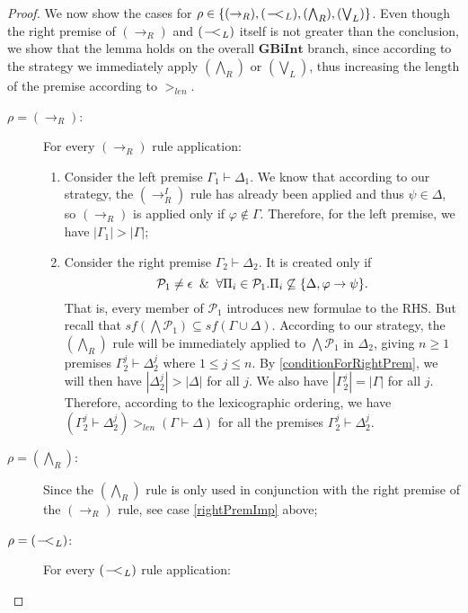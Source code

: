 \documentclass{llncs}
\numberwithin{equation}{section}
\newcommand{\Pred}{{\mathcal{P}}}
\newcommand{\ExImp}{\rightarrow}
\newcommand{\sequent}{\vdash}
\newcommand{\Imp}{\rightarrow}
\newcommand{\WeakImp}{
\begin{picture}(10,10)
     \put(1,0){$-$}
     \put(7,0){$<$}
   \end{picture}
   \;\; 
}
\newcommand{\GBiInt}{\mathbf{GBiInt}}
\newcommand{\ImpRightRule}{({\Imp_R})}
\newcommand{\ImpRightRuleI}{({\Imp_R^I})}
\newcommand{\WeakImpLeftRule}{({\WeakImp_L})}
\newcommand{\SpecialRightRule}{({\bigwedge_R})}
\newcommand{\SpecialLeftRule}{({\bigvee_L})}
\begin{document}
\begin{proof}
We now show the cases for $\rho \in \{\ImpRightRule, \WeakImpLeftRule, \SpecialRightRule, \SpecialLeftRule \}$.
Even though the right premise of $\ImpRightRule$ and $\WeakImpLeftRule$ itself is not greater than the conclusion, we show that the lemma holds on the overall $\GBiInt$ branch, since according to the strategy we immediately apply $\SpecialRightRule$ or $\SpecialLeftRule$, thus increasing the length of the premise according to $>_{len}$.
\begin{description}
	\item[\rm{$\rho = \ImpRightRule$:}] For every $\ImpRightRule$ rule application:
		\begin{enumerate} 
			\item Consider the left premise $\Gamma_1 \sequent \Delta_1$. We know that according to our strategy, the $\ImpRightRuleI$ rule has already been applied and thus $\psi \in \Delta$, so $\ImpRightRule$ is applied only if $\varphi \not\in \Gamma$. Therefore, for the left premise, we have $|\Gamma_1| > |\Gamma|$;
			\item\label{rightPremImp} Consider the right premise $\Gamma_2 \sequent \Delta_2$. It is created only if
\begin{equation}\label{conditionForRightPrem}
	\Pred_1 \ne \epsilon \And \forall \Pi_i \in \Pred_1 . \Pi_i \not\subseteq \{ \Delta, \varphi \ExImp \psi \}.
\end{equation}
			That is, every member of $\Pred_1$ introduces new formulae to the RHS. But recall that $sf(\bigwedge \Pred_1) \subseteq sf(\Gamma \cup \Delta)$. According to our strategy, the $\SpecialRightRule$ rule will be immediately applied to $\bigwedge \Pred_1$ in $\Delta_2$, giving $n \geq 1$ premises $\Gamma_2^j \sequent \Delta_2^j$ where $1 \leq j \leq n$. By \ref{conditionForRightPrem}, we will then have $|\Delta_2^j| > |\Delta|$ for all $j$. We also have $|\Gamma_2^j| = |\Gamma|$ for all $j$. Therefore, according to the lexicographic ordering, we have $(\Gamma_2^j \sequent \Delta_2^j) >_{len} (\Gamma \sequent \Delta)$ for all the premises $\Gamma_2^j \sequent \Delta_2^j$.
		\end{enumerate}			
	\item[\rm{$\rho = \SpecialRightRule$:}] Since the $\SpecialRightRule$ rule is only used in conjunction with the right premise of the $\ImpRightRule$ rule, see case \ref{rightPremImp} above;						
	\item[\rm{$\rho = \WeakImpLeftRule$:}] For every $\WeakImpLeftRule$ rule application:
		\begin{enumerate} 

\end{enumerate}
\end{description}
\end{proof}
\end{document}
